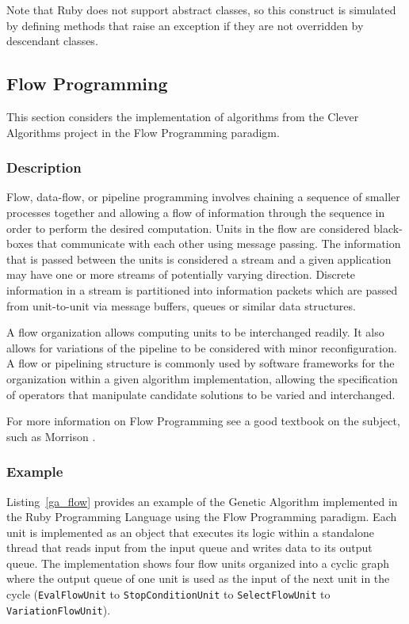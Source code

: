 Note that Ruby does not support abstract classes, so this construct is simulated by defining methods that raise an exception if they are not overridden by descendant classes.




% 
% 
\subsection{Flow Programming}
\label{sec:flow}
This section considers the implementation of algorithms from the Clever Algorithms project in the Flow Programming paradigm.

\subsubsection{Description}
Flow, data-flow, or pipeline programming involves chaining a sequence of smaller processes together and allowing a flow of information through the sequence in order to perform the desired computation. Units in the flow are considered black-boxes that communicate with each other using message passing. The information that is passed between the units is considered a stream and a given application may have one or more streams of potentially varying direction. Discrete information in a stream is partitioned into information packets which are passed from unit-to-unit via message buffers, queues or similar data structures.

A flow organization allows computing units to be interchanged readily. It also allows for variations of the pipeline to be considered with minor reconfiguration. A flow or pipelining structure is commonly used by software frameworks for the organization within a given algorithm implementation, allowing the specification of operators that manipulate candidate solutions to be varied and interchanged.

For more information on Flow Programming see a good textbook on the subject, such as Morrison \cite{Morrison2010}.

\subsubsection{Example}
Listing~\ref{ga_flow} provides an example of the Genetic Algorithm implemented in the Ruby Programming Language using the Flow Programming paradigm.
Each unit is implemented as an object that executes its logic within a standalone thread that reads input from the input queue and writes data to its output queue. The implementation shows four flow units organized into a cyclic graph where the output queue of one unit is used as the input of the next unit in the cycle (\texttt{Eval\-Flow\-Unit} to \texttt{Stop\-Condition\-Unit} to \texttt{Select\-Flow\-Unit} to \texttt{Variation\-Flow\-Unit}). 

